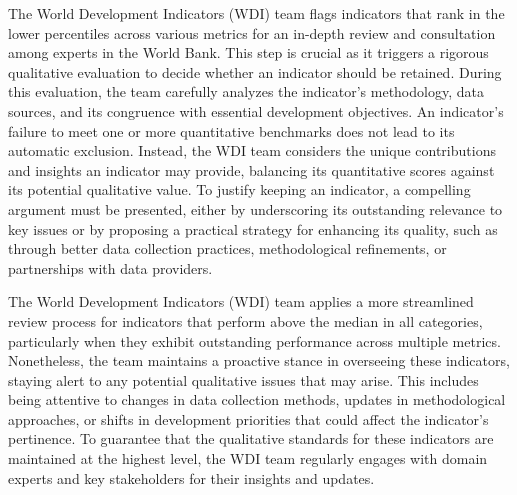 \documentclass[
  11pt,
  a4paper,
  DIV=11,
  numbers=noendperiod]{scrreprt}
\begin{document}
The World Development Indicators (WDI) team flags indicators that rank
in the lower percentiles across various metrics for an in-depth review
and consultation among experts in the World Bank. This step is crucial
as it triggers a rigorous qualitative evaluation to decide whether an
indicator should be retained. During this evaluation, the team carefully
analyzes the indicator's methodology, data sources, and its congruence
with essential development objectives. An indicator's failure to meet
one or more quantitative benchmarks does not lead to its automatic
exclusion. Instead, the WDI team considers the unique contributions and
insights an indicator may provide, balancing its quantitative scores
against its potential qualitative value. To justify keeping an
indicator, a compelling argument must be presented, either by
underscoring its outstanding relevance to key issues or by proposing a
practical strategy for enhancing its quality, such as through better
data collection practices, methodological refinements, or partnerships
with data providers.

The World Development Indicators (WDI) team applies a more streamlined
review process for indicators that perform above the median in all
categories, particularly when they exhibit outstanding performance
across multiple metrics. Nonetheless, the team maintains a proactive
stance in overseeing these indicators, staying alert to any potential
qualitative issues that may arise. This includes being attentive to
changes in data collection methods, updates in methodological
approaches, or shifts in development priorities that could affect the
indicator's pertinence. To guarantee that the qualitative standards for
these indicators are maintained at the highest level, the WDI team
regularly engages with domain experts and key stakeholders for their
insights and updates.
\end{document}
